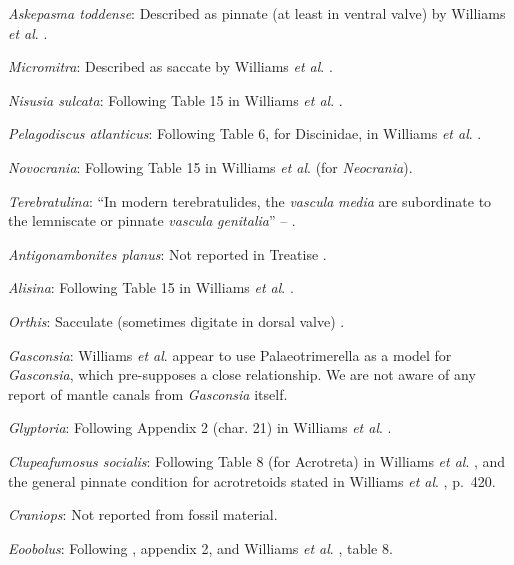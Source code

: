 \documentclass[openany]{book}
\theoremstyle{definition}
\theoremstyle{definition}
\theoremstyle{definition}
\theoremstyle{remark}
\begin{document}
\emph{Askepasma toddense}: Described as pinnate (at least in ventral
valve) by Williams \emph{et al}.
\citeyearpar[p.~250]{Williams1998Thediversity}.

\emph{Micromitra}: Described as saccate by Williams \emph{et al}.
\citeyearpar{Williams1998Thediversity}.

\emph{Nisusia sulcata}: Following Table 15 in Williams \emph{et al}.
\citeyearpar{Williams2000BrachiopodaLinguliformea}.

\emph{Pelagodiscus atlanticus}: Following Table 6, for Discinidae, in
Williams \emph{et al}.
\citeyearpar{Williams2000BrachiopodaLinguliformea}.

\emph{Novocrania}: Following Table 15 in Williams \emph{et al}.
\citeyearpar{Williams2000BrachiopodaLinguliformea} (for
\emph{Neocrania}).

\emph{Terebratulina}: ``In modern terebratulides, the \emph{vascula}
\emph{media} are subordinate to the lemniscate or pinnate \emph{vascula}
\emph{genitalia}'' -- \citet{Williams1997BrachiopodaRevised}.

\emph{Antigonambonites planus}: Not reported in Treatise
\citep{Williams2000BrachiopodaLinguliformea}.

\emph{Alisina}: Following Table 15 in Williams \emph{et al}.
\citeyearpar{Williams2000BrachiopodaLinguliformea}.

\emph{Orthis}: Sacculate (sometimes digitate in dorsal valve)
\citep[p716]{Williams2000BrachiopodaLinguliformea}.

\emph{Gasconsia}: Williams \emph{et al}. \citeyearpar[table
15]{Williams2000BrachiopodaLinguliformea} appear to use Palaeotrimerella
\citep[as drawn in][]{Williams1997BrachiopodaRevised} as a model for
\emph{Gasconsia}, which pre-supposes a close relationship. We are not
aware of any report of mantle canals from \emph{Gasconsia} itself.

\emph{Glyptoria}: Following Appendix 2 (char. 21) in Williams \emph{et
al}. \citeyearpar{Williams1998Thediversity}.

\emph{Clupeafumosus socialis}: Following Table 8 (for Acrotreta) in
Williams \emph{et al}.
\citeyearpar{Williams2000BrachiopodaLinguliformea}, and the general
pinnate condition for acrotretoids stated in Williams \emph{et al}.
\citeyearpar{Williams1997BrachiopodaRevised}, p.~420.

\emph{Craniops}: Not reported from fossil material.

\emph{Eoobolus}: Following \citet{Williams1998Thediversity}, appendix 2,
and Williams \emph{et al}.
\citeyearpar{Williams2000BrachiopodaLinguliformea}, table 8.
\end{document}

